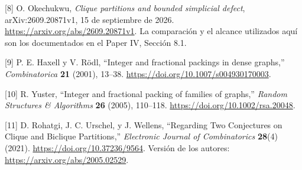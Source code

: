 \documentclass[spanish,11pt,a4paper]{article}
\begin{document}
{[}8{]} O. Okechukwu, \emph{Clique partitions and bounded simplicial
defect}, arXiv:2609.20871v1, 15 de septiembre de 2026.
\url{https://arxiv.org/abs/2609.20871v1}. La comparación y el alcance
utilizados aquí son los documentados en el Paper IV, Sección 8.1.

{[}9{]} P. E. Haxell y V. Rödl, ``Integer and fractional packings in
dense graphs,'' \emph{Combinatorica} \textbf{21} (2001), 13--38.
\url{https://doi.org/10.1007/s004930170003}.

{[}10{]} R. Yuster, ``Integer and fractional packing of families of
graphs,'' \emph{Random Structures \& Algorithms} \textbf{26} (2005),
110--118. \url{https://doi.org/10.1002/rsa.20048}.

{[}11{]} D. Rohatgi, J. C. Urschel, y J. Wellens, ``Regarding Two
Conjectures on Clique and Biclique Partitions,'' \emph{Electronic
Journal of Combinatorics} \textbf{28}(4) (2021).
\url{https://doi.org/10.37236/9564}. Versión de los autores:
\url{https://arxiv.org/abs/2005.02529}.
\end{document}
